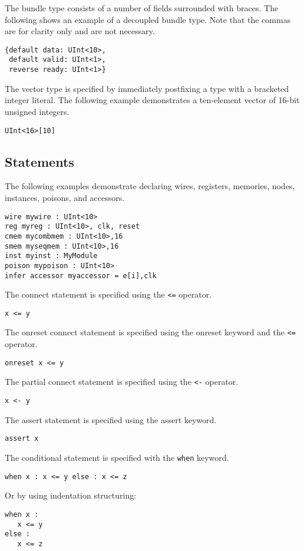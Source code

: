 \documentclass[12pt]{article}
\begin{document}
The bundle type consists of a number of fields surrounded with braces.
The following shows an example of a decoupled bundle type.
Note that the commas are for clarity only and are not necessary.
\begin{verbatim}
{default data: UInt<10>,
 default valid: UInt<1>,
 reverse ready: UInt<1>} 
\end{verbatim}

The vector type is specified by immediately postfixing a type with a bracketed integer literal.
The following example demonstrates a ten-element vector of 16-bit unsigned integers.
\begin{verbatim}
UInt<16>[10]
\end{verbatim}

\subsection*{Statements}
The following examples demonstrate declaring wires, registers, memories, nodes, instances, poisons, and accessors.
\begin{verbatim}
wire mywire : UInt<10> 
reg myreg : UInt<10>, clk, reset 
cmem mycombmem : UInt<10>,16
smem myseqmem : UInt<10>,16
inst myinst : MyModule 
poison mypoison : UInt<10> 
infer accessor myaccessor = e[i],clk
\end{verbatim}

The connect statement is specified using the \verb|<=| operator.
\begin{verbatim}
x <= y
\end{verbatim}

The onreset connect statement is specified using the onreset keyword and the \verb|<=| operator.
\begin{verbatim}
onreset x <= y 
\end{verbatim}

The partial connect statement is specified using the \verb|<-| operator.
\begin{verbatim}
x <- y 
\end{verbatim}

The assert statement is specified using the assert keyword.
\begin{verbatim}
assert x
\end{verbatim}

The conditional statement is specified with the \verb|when| keyword.
\begin{verbatim}
when x : x <= y else : x <= z
\end{verbatim}
Or by using indentation structuring:
\begin{verbatim}
when x :
   x <= y
else :
   x <= z
\end{verbatim}
\end{document}

